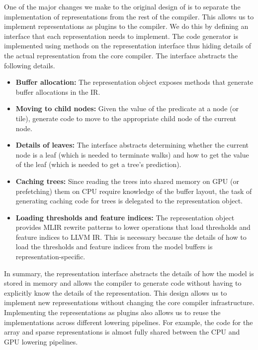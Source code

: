 One of the major changes we make to the original design of \Treebeard{} \cite{Treebeard} is to
separate the implementation of representations from the rest of the compiler. This allows
us to implement representations as plugins to the compiler. We do this by defining an interface 
that each representation needs to implement. The code generator is implemented using methods 
on the representation interface thus hiding details of the actual representation from the core 
compiler. The interface abstracts the following details. 
\begin{itemize}
  \item \textbf{Buffer allocation:} The representation object exposes methods that generate 
  buffer allocations in the IR. 
  \item \textbf{Moving to child nodes:} Given the value of the predicate at a node (or tile),
  generate code to move to the appropriate child node of the current node.
  \item \textbf{Details of leaves:} The interface abstracts determining whether the current
  node is a leaf (which is needed to terminate walks) and how to get the value of the leaf
  (which is needed to get a tree's prediction).
  \item \textbf{Caching trees:} Since reading the trees into shared memory on GPU (or prefetching)
  them on CPU require knowledge of the buffer layout, the task of generating caching code for trees
  is delegated to the representation object. 
  \item \textbf{Loading thresholds and feature indices:} The representation object provides MLIR 
  rewrite patterns to lower operations that load thresholds and feature indices to LLVM IR. This
  is necessary because the details of how to load the thresholds and feature indices from the model 
  buffers is representation-specific.
\end{itemize}

In summary, the representation interface abstracts the details of how the model is stored in memory
and allows the compiler to generate code without having to explicitly know the details of the
representation. This design allows us to implement new representations without changing the core
compiler infrastructure. Implementing the representations as plugins also allows us to reuse
the implementations across different lowering pipelines. For example, the code for the array 
and sparse representations is almost fully shared between the CPU and GPU lowering pipelines.   

